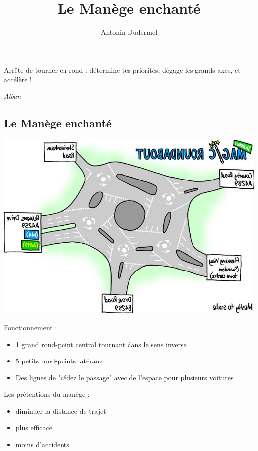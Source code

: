 \documentclass[slidetop,11pt]{beamer}
\title{Le Manège enchanté}
\date{}
\author{Antonin Dudermel}
\begin{document}

\frame{\titlepage}

\begin{frame}
	\epigraph{Arrête de tourner en rond : détermine tes priorités, dégage les grands axes, et accélère !}{\it Alban}
\end{frame}

\begin{frame}
	\tableofcontents
\end{frame}

\begin{frame}
	\section{Le Manège enchanté}
	\begin{center}
		\includegraphics[scale=0.4]{./images/magic}
	\end{center}
\end{frame}

\begin{frame}
	Fonctionnement :
	\begin{itemize}
		\item 1 grand rond-point central tournant dans le sens inverse
		\item 5 petits rond-points latéraux
		\item Des lignes de "cédez le passage" avec de l'espace pour plusieurs voitures
	\end{itemize}
\end{frame}

\begin{frame}
	Les prétentions du manège :
	\begin{itemize}
		\item diminuer la distance de trajet
		\item plus efficace
		\item moins d'accidents
	\end{itemize}
\end{frame}
\end{document}
